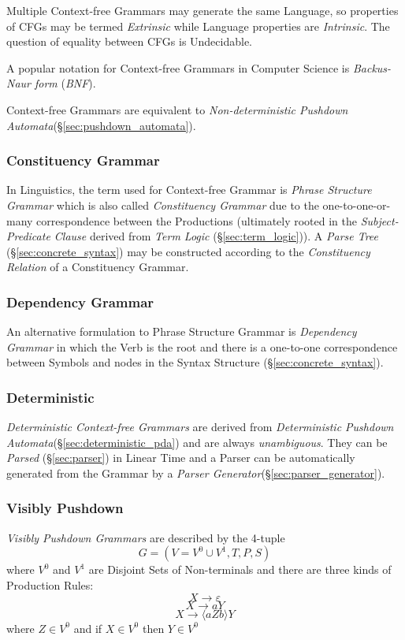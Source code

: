 Multiple Context-free Grammars may generate the same Language, so
properties of CFGs may be termed \emph{Extrinsic} while Language
properties are \emph{Intrinsic}. The question of equality between CFGs
is Undecidable.

A popular notation for Context-free Grammars in Computer Science is
\emph{Backus-Naur form} (\emph{BNF}).

Context-free Grammars are equivalent to \emph{Non-deterministic
  Pushdown Automata}(\S\ref{sec:pushdown_automata}).



\subsubsection{Constituency Grammar}\label{sec:constituency_grammar}

In Linguistics, the term used for Context-free Grammar is \emph{Phrase
  Structure Grammar} which is also called \emph{Constituency Grammar}
due to the one-to-one-or-many correspondence between the Productions
(ultimately rooted in the \emph{Subject-Predicate Clause} derived from
\emph{Term Logic} (\S\ref{sec:term_logic})). A \emph{Parse Tree}
(\S\ref{sec:concrete_syntax}) may be constructed according to the
\emph{Constituency Relation} of a Constituency Grammar.

\subsubsection{Dependency Grammar}\label{sec:dependency_grammar}
An alternative formulation to Phrase Structure Grammar is
\emph{Dependency Grammar} in which the Verb is the root and there is a
one-to-one correspondence between Symbols and nodes in the Syntax
Structure (\S\ref{sec:concrete_syntax}).

\subsubsection{Deterministic}\label{sec:deterministic_cfg}
\emph{Deterministic Context-free Grammars} are derived from
\emph{Deterministic Pushdown
  Automata}(\S\ref{sec:deterministic_pda}) and are always
\emph{unambiguous}. They can be \emph{Parsed} (\S\ref{sec:parser}) in
Linear Time and a Parser can be automatically generated from
the Grammar by a \emph{Parser
  Generator}(\S\ref{sec:parser_generator}).

\subsubsection{Visibly Pushdown}
\emph{Visibly Pushdown Grammars} are described by the 4-tuple
\[
    G = (V=V^0 \cup V^1,T,P,S)
\]
where $V^0$ and $V^1$ are Disjoint Sets of Non-terminals and there
are three kinds of Production Rules:
\[
    X \rightarrow \varepsilon
\]\[
    X \rightarrow aY
\]\[
    X \rightarrow \langle aZb \rangle Y
\]
where $Z \in V^0$ and if $X \in V^0$ then $Y \in V^0$

